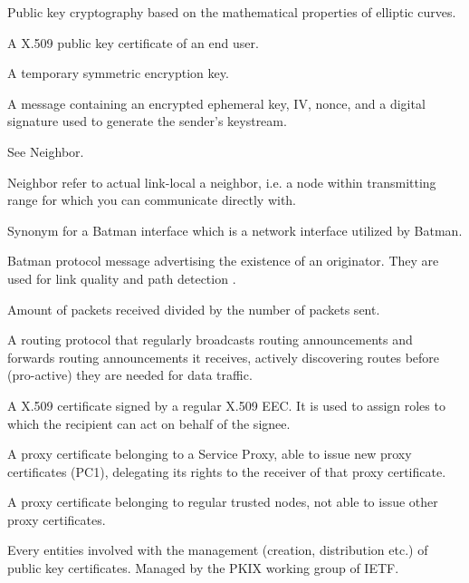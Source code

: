 \begin{acronym}
	Public key cryptography based on the mathematical properties of elliptic
	curves.

	A X.509 public key certificate of an end user.
	
	A temporary symmetric encryption key. 

	A message containing an encrypted ephemeral key, IV, nonce, and a digital
	signature used to generate the sender's keystream.

	See Neighbor.

	Neighbor refer to actual link-local a neighbor, i.e. a node within
	transmitting range for which you can communicate directly with.

	Synonym for a Batman interface which is a network interface utilized by
	Batman.

	Batman protocol message advertising the existence of an originator. They are
	used for link quality and path detection \cite{batman_rfc}.

	Amount of packets received divided by the number of packets sent.

	A routing protocol that regularly broadcasts routing announcements and
	forwards routing announcements it receives, actively discovering routes before
	(pro-active) they are needed for data traffic.

	A X.509 certificate signed by a regular X.509 EEC. It is used to assign roles
	to which the recipient can act on behalf of the signee.

	A proxy certificate belonging to a Service Proxy, able to issue new proxy
	certificates (PC1), delegating its rights to the receiver of that proxy
	certificate.
	
	A proxy certificate belonging to regular trusted nodes, not able to issue other
	proxy certificates.
	
	
	Every entities involved with the management (creation, distribution etc.) of
	public key certificates. Managed by the PKIX working group of IETF.



\end{acronym}
